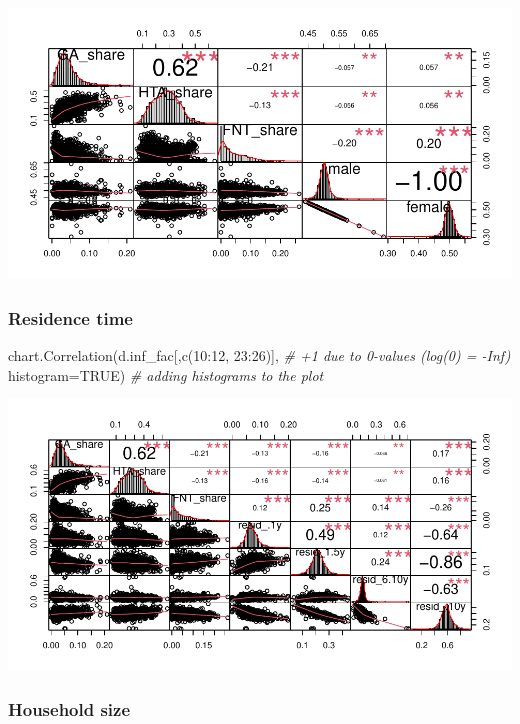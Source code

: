 \documentclass[
]{article}
\newenvironment{Shaded}{\begin{snugshade}}{\end{snugshade}}
\newcommand{\AttributeTok}[1]{\textcolor[rgb]{0.77,0.63,0.00}{#1}}
\newcommand{\CommentTok}[1]{\textcolor[rgb]{0.56,0.35,0.01}{\textit{#1}}}
\newcommand{\ConstantTok}[1]{\textcolor[rgb]{0.00,0.00,0.00}{#1}}
\newcommand{\DecValTok}[1]{\textcolor[rgb]{0.00,0.00,0.81}{#1}}
\newcommand{\FunctionTok}[1]{\textcolor[rgb]{0.00,0.00,0.00}{#1}}
\newcommand{\NormalTok}[1]{#1}
\newcommand{\SpecialCharTok}[1]{\textcolor[rgb]{0.00,0.00,0.00}{#1}}
\begin{document}
\includegraphics{Lin_Mod_Clus_Analysis_files/figure-latex/unnamed-chunk-9-1.pdf}

\hypertarget{residence-time}{%
\subsubsection{Residence time}\label{residence-time}}

\begin{Shaded}
\begin{Highlighting}[]
\FunctionTok{chart.Correlation}\NormalTok{(d.inf\_fac[,}\FunctionTok{c}\NormalTok{(}\DecValTok{10}\SpecialCharTok{:}\DecValTok{12}\NormalTok{, }\DecValTok{23}\SpecialCharTok{:}\DecValTok{26}\NormalTok{)], }\CommentTok{\# +1 due to 0{-}values (log(0) = {-}Inf)}
                  \AttributeTok{histogram=}\ConstantTok{TRUE}\NormalTok{) }\CommentTok{\# adding histograms to the plot}
\end{Highlighting}
\end{Shaded}

\includegraphics{Lin_Mod_Clus_Analysis_files/figure-latex/unnamed-chunk-10-1.pdf}

\hypertarget{household-size}{%
\subsubsection{Household size}\label{household-size}}
\end{document}
